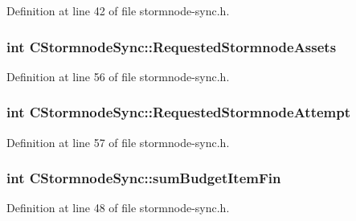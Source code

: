 Definition at line 42 of file stormnode-\/sync.\+h.

\hypertarget{class_c_stormnode_sync_abd82a675dc58c17710dac55b20426945}{}
\subsubsection[{Requested\+Stormnode\+Assets}]{\setlength{\rightskip}{0pt plus 5cm}int C\+Stormnode\+Sync\+::\+Requested\+Stormnode\+Assets}\label{class_c_stormnode_sync_abd82a675dc58c17710dac55b20426945}


Definition at line 56 of file stormnode-\/sync.\+h.

\hypertarget{class_c_stormnode_sync_a66dcbc68478f042210ec161a7aba7fd5}{}
\subsubsection[{Requested\+Stormnode\+Attempt}]{\setlength{\rightskip}{0pt plus 5cm}int C\+Stormnode\+Sync\+::\+Requested\+Stormnode\+Attempt}\label{class_c_stormnode_sync_a66dcbc68478f042210ec161a7aba7fd5}


Definition at line 57 of file stormnode-\/sync.\+h.

\hypertarget{class_c_stormnode_sync_ae54e3ff056c6bab202db68c4ceb0792e}{}
\subsubsection[{sum\+Budget\+Item\+Fin}]{\setlength{\rightskip}{0pt plus 5cm}int C\+Stormnode\+Sync\+::sum\+Budget\+Item\+Fin}\label{class_c_stormnode_sync_ae54e3ff056c6bab202db68c4ceb0792e}


Definition at line 48 of file stormnode-\/sync.\+h.

\hypertarget{class_c_stormnode_sync_a04a5e8c869c0b3802ce5ab2b8d0c7952}{}

